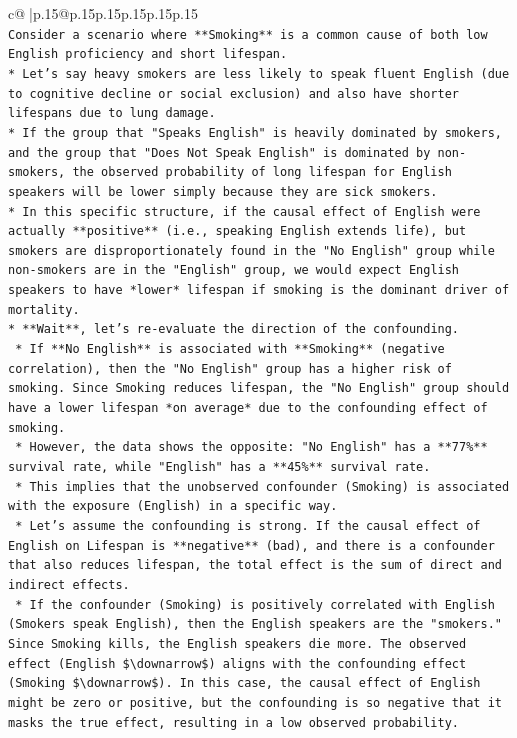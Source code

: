 \documentclass{article}
\begin{document}
{\begin{supertabular}{c@{$\;$}|p{.15\linewidth}@{}p{.15\linewidth}p{.15\linewidth}p{.15\linewidth}p{.15\linewidth}p{.15\linewidth}}
{{{\\ 
\texttt{Consider a scenario where **Smoking** is a common cause of both low English proficiency and short lifespan.} \\
\texttt{*   Let's say heavy smokers are less likely to speak fluent English (due to cognitive decline or social exclusion) and also have shorter lifespans due to lung damage.} \\
\texttt{*   If the group that "Speaks English" is heavily dominated by smokers, and the group that "Does Not Speak English" is dominated by non{-}smokers, the observed probability of long lifespan for English speakers will be lower simply because they are sick smokers.} \\
\texttt{*   In this specific structure, if the causal effect of English were actually **positive** (i.e., speaking English extends life), but smokers are disproportionately found in the "No English" group while non{-}smokers are in the "English" group, we would expect English speakers to have *lower* lifespan if smoking is the dominant driver of mortality.} \\
\texttt{*   **Wait**, let's re{-}evaluate the direction of the confounding.} \\
\texttt{    *   If **No English** is associated with **Smoking** (negative correlation), then the "No English" group has a higher risk of smoking. Since Smoking reduces lifespan, the "No English" group should have a lower lifespan *on average* due to the confounding effect of smoking.} \\
\texttt{    *   However, the data shows the opposite: "No English" has a **77\%** survival rate, while "English" has a **45\%** survival rate.} \\
\texttt{    *   This implies that the unobserved confounder (Smoking) is associated with the exposure (English) in a specific way.} \\
\texttt{    *   Let's assume the confounding is strong. If the causal effect of English on Lifespan is **negative** (bad), and there is a confounder that also reduces lifespan, the total effect is the sum of direct and indirect effects.} \\
\texttt{    *   If the confounder (Smoking) is positively correlated with English (Smokers speak English), then the English speakers are the "smokers." Since Smoking kills, the English speakers die more. The observed effect (English \$\textbackslash{}downarrow\$) aligns with the confounding effect (Smoking \$\textbackslash{}downarrow\$). In this case, the causal effect of English might be zero or positive, but the confounding is so negative that it masks the true effect, resulting in a low observed probability.} \\
}}}
\end{supertabular}}
\end{document}
